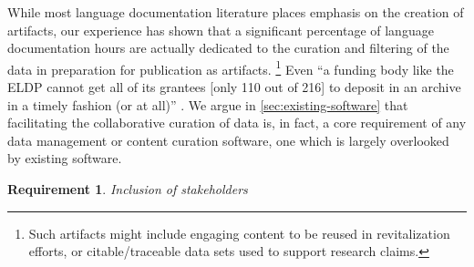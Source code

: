 \documentclass[11pt]{article}
\newtheorem{requirement}{Requirement}
\begin{document}
While most language documentation literature places emphasis on the creation of
artifacts, our experience has shown that a significant percentage of language
documentation hours are actually dedicated to the curation and filtering of the
data in preparation for publication as artifacts.%
\footnote{Such artifacts might include engaging content to be reused in
    revitalization efforts, or citable/traceable data sets used to support
research claims.}
Even ``a funding body like the ELDP cannot get all of its grantees [only 110
out of 216] to deposit in an archive in a timely fashion (or at all)''
\cite{Thieberger:2012}. We argue in \autoref{sec:existing-software} that
facilitating the collaborative curation of data is, in fact, a core requirement
of any data management or content curation software, one which is largely
overlooked by existing software.


 
 

\begin{requirement}
	\label{req:inclusive}
       Inclusion of stakeholders
\end{requirement}
\end{document}
